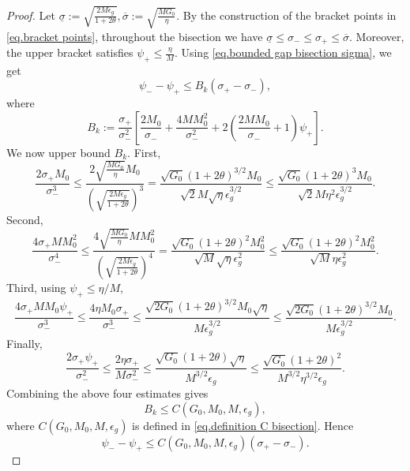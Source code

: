 \documentclass{article}
\numberwithin{equation}{section}
\numberwithin{equation}{section}
\begin{document}
\begin{proof}
    Let
    \(
    \underline{\sigma}
    :=
    \sqrt{\frac{2M\epsilon_g}{1+2\theta}},
    \overline{\sigma}
    :=
    \sqrt{\frac{MG_0}{\eta}}.
    \)
    By the construction of the bracket points in \eqref{eq.bracket points},
    throughout the bisection we have
    \(
    \underline{\sigma}
    \le
    \sigma_-
    \le
    \sigma_+
    \le
    \overline{\sigma}.
    \)
    Moreover, the upper bracket satisfies
    \(
    \psi_+\le \frac{\eta}{M}.
    \)
    Using \eqref{eq.bounded gap bisection sigma}, we get
    \[
        \psi_- - \psi_+
        \le
        B_k(\sigma_+-\sigma_-),
    \]
    where
    \[
        B_k
        :=
        \frac{\sigma_+}{\sigma_-^2}
        \left[
            \frac{2M_0}{\sigma_-}
            +
            \frac{4MM_0^2}{\sigma_-^2}
            +
            2\left(
            \frac{2MM_0}{\sigma_-}+1
            \right)\psi_+
            \right].
    \]
    We now upper bound \(B_k\). First,
    \[
        \frac{2\sigma_+M_0}{\sigma_-^3}
        \le
        \frac{
            2\sqrt{\frac{MG_0}{\eta}}M_0
        }{
            \left(
            \sqrt{\frac{2M\epsilon_g}{1+2\theta}}
            \right)^3
        }  =
        \frac{
            \sqrt{G_0}(1+2\theta)^{3/2}M_0
        }{
            \sqrt{2}M\sqrt{\eta}\epsilon_g^{3/2}
        } \le
        \frac{
            \sqrt{G_0}(1+2\theta)^3M_0
        }{
            \sqrt{2}M\eta^2\epsilon_g^{3/2}
        }.
    \]
    Second,
    \[
        \frac{4\sigma_+MM_0^2}{\sigma_-^4}
        \le
        \frac{
            4\sqrt{\frac{MG_0}{\eta}}MM_0^2
        }{
            \left(
            \sqrt{\frac{2M\epsilon_g}{1+2\theta}}
            \right)^4
        } =
        \frac{
            \sqrt{G_0}(1+2\theta)^2M_0^2
        }{
            \sqrt{M}\sqrt{\eta}\epsilon_g^2
        } \le
        \frac{
            \sqrt{G_0}(1+2\theta)^2M_0^2
        }{
            \sqrt{M}\eta\epsilon_g^2
        }.
    \]
    Third, using \(\psi_+\le \eta/M\),
    \[
        \frac{4\sigma_+MM_0\psi_+}{\sigma_-^3}
        \le
        \frac{4\eta M_0\sigma_+}{\sigma_-^3} \le
        \frac{
            \sqrt{2G_0}(1+2\theta)^{3/2}M_0\sqrt{\eta}
        }{
            M\epsilon_g^{3/2}
        } \le
        \frac{
            \sqrt{2G_0}(1+2\theta)^{3/2}M_0
        }{
            M\epsilon_g^{3/2}
        }.
    \]
    Finally,
    \[
        \frac{2\sigma_+\psi_+}{\sigma_-^2}
        \le
        \frac{2\eta\sigma_+}{M\sigma_-^2} \le
        \frac{
            \sqrt{G_0}(1+2\theta)\sqrt{\eta}
        }{
            M^{3/2}\epsilon_g
        } \le
        \frac{
            \sqrt{G_0}(1+2\theta)^2
        }{
            M^{3/2}\eta^{3/2}\epsilon_g
        }.
    \]
    Combining the above four estimates gives
    \[
        B_k
        \le
        C(G_0,M_0,M,\epsilon_g),
    \]
    where \(C(G_0,M_0,M,\epsilon_g)\) is defined in
    \eqref{eq.definition C bisection}. Hence
    \[
        \psi_- - \psi_+
        \le
        C(G_0,M_0,M,\epsilon_g)(\sigma_+-\sigma_-).
    \]


\end{proof}
\end{document}
